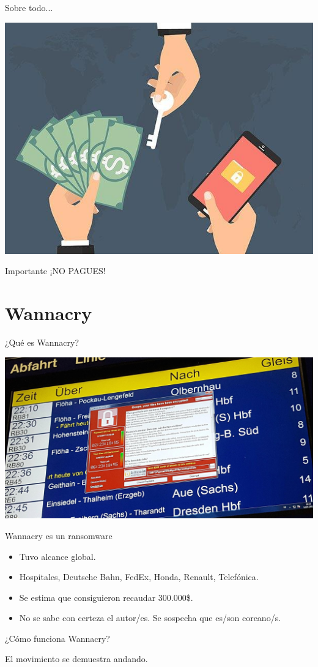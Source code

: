 \documentclass[10pt]{beamer}
\begin{document}
\begin{frame}[fragile]{Sobre todo...}
	\begin{center}
		\includegraphics[scale=0.5]{./Imagenes/ransomware9.jpg}
	\end{center}
	\pause
	\begin{alertblock}{Importante}
		¡NO PAGUES!
	\end{alertblock}
\end{frame}

\section{Wannacry}

\begin{frame}[fragile]{¿Qué es Wannacry?}
	\begin{center}
		\includegraphics[scale=0.12]{./Imagenes/ransomware10.jpg}
	\end{center}
	\pause
	\begin{block}{Wannacry es un ransomware}
		\pause
		\begin{itemize}
			\item Tuvo alcance global.
			\pause
			\item Hospitales, Deutsche Bahn, FedEx, Honda, Renault, Telefónica.
			\pause
			\item Se estima que consiguieron recaudar 300.000\$.
			\pause
			\item No se sabe con certeza el autor/es. Se sospecha que es/son coreano/s.
		\end{itemize}
	\end{block}
\end{frame}

\begin{frame}[fragile]{¿Cómo funciona Wannacry?}
	\begin{center}
		El movimiento se demuestra andando.
	\end{center}
\end{frame}
\end{document}
